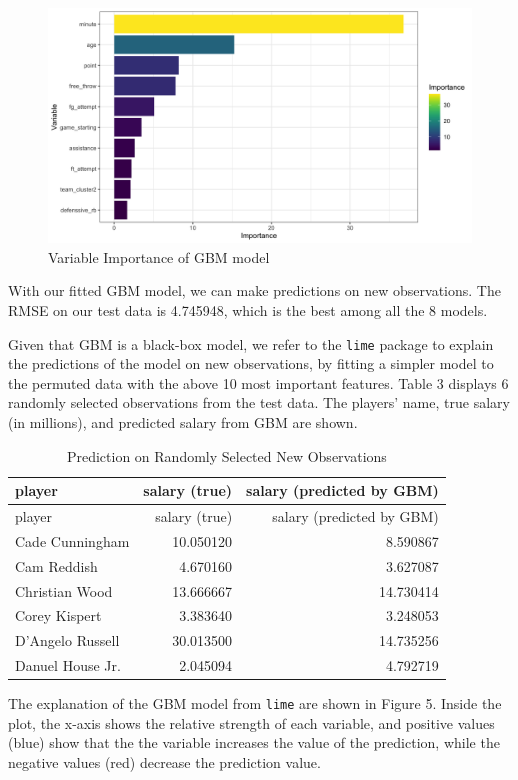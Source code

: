 \documentclass[
]{article}
\begin{document}
\begin{figure}
\centering
\includegraphics{report_figures/figure_tree_3.png}
\caption{Variable Importance of GBM model}
\end{figure}

With our fitted GBM model, we can make predictions on new observations.
The RMSE on our test data is 4.745948, which is the best among all the 8
models.

Given that GBM is a black-box model, we refer to the \texttt{lime}
package to explain the predictions of the model on new observations, by
fitting a simpler model to the permuted data with the above 10 most
important features. Table 3 displays 6 randomly selected observations
from the test data. The players' name, true salary (in millions), and
predicted salary from GBM are shown.

\begin{longtable}[]{@{}lrr@{}}
\caption{Prediction on Randomly Selected New
Observations}\tabularnewline
\toprule
player & salary (true) & salary (predicted by GBM) \\
\midrule
\endfirsthead
\toprule
player & salary (true) & salary (predicted by GBM) \\
\midrule
\endhead
Cade Cunningham & 10.050120 & 8.590867 \\
Cam Reddish & 4.670160 & 3.627087 \\
Christian Wood & 13.666667 & 14.730414 \\
Corey Kispert & 3.383640 & 3.248053 \\
D'Angelo Russell & 30.013500 & 14.735256 \\
Danuel House Jr. & 2.045094 & 4.792719 \\
\bottomrule
\end{longtable}

The explanation of the GBM model from \texttt{lime} are shown in Figure
5. Inside the plot, the x-axis shows the relative strength of each
variable, and positive values (blue) show that the the variable
increases the value of the prediction, while the negative values (red)
decrease the prediction value.
\end{document}
